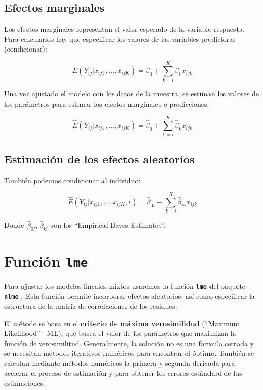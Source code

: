 \documentclass[
]{book}
\begin{document}
\hypertarget{efectos-marginales}{%
\subsection{Efectos marginales}\label{efectos-marginales}}

Los efectos marginales representan el valor esperado de la variable respuesta. Para calcularlos hay que especificar los valores de las variables predictoras (condicionar):

\[E(Y_{ij} | x_{ij1},\ldots,x_{ijK}) = \beta_0 + \sum_{k=i}^K \beta_k x_{ijk}\]

Una vez ajustado el modelo con los datos de la muestra, se estiman los valores de los parámetros para estimar los efectos marginales o predicciones.

\[\hat{E}(Y_{ij} | x_{ij1},\ldots,x_{ijK}) = \hat{\beta}_0 + \sum_{k=i}^K \hat{\beta}_k x_{ijk}\]

\hypertarget{estimaciuxf3n-de-los-efectos-aleatorios}{%
\subsection{Estimación de los efectos aleatorios}\label{estimaciuxf3n-de-los-efectos-aleatorios}}

También podemos condicionar al individuo:

\[\hat{E}(Y_{ij} | x_{ij1},\ldots,x_{ijK}, i) = \hat{\beta}_{0i} + \sum_{k=i}^K \hat{\beta}_{ki} x_{ijk}\]

Donde \(\hat{\beta}_{0i}\), \(\hat{\beta}_{ki}\) son los ``Empirical Bayes Estimates''.

\hypertarget{funciuxf3n-lme}{%
\section{\texorpdfstring{Función \texttt{lme}}{Función lme}}\label{funciuxf3n-lme}}

Para ajustar los modelos lineales mixtos usaremos la función \textbf{\texttt{lme}} del paquete \textbf{\texttt{nlme}} \citep{R-nlme}.
Esta función permite incorporar efectos aleatorios, así como especificar la estructura de la matriz de correlaciones de los residuos.

El método se basa en el \textbf{criterio de máxima verosimilidud} (``Maximum Likelihood'' - ML), que busca el valor de los parámetros que maximizan la función de verosimilitud. Generalmente, la solución no es una fórmula cerrada y se necesitan métodos iterativos numéricos para encontrar el óptimo. También se calculan mediante métodos numéricos la primera y segunda derivada para acelerar el proceso de estimación y para obtener los errores estándard de las estimaciones.
\end{document}
